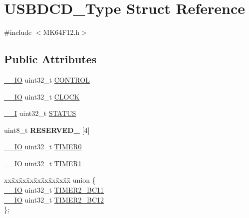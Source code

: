 \hypertarget{structUSBDCD__Type}{}\section{U\+S\+B\+D\+C\+D\+\_\+\+Type Struct Reference}
\label{structUSBDCD__Type}


{\ttfamily \#include $<$M\+K64\+F12.\+h$>$}

\subsection*{Public Attributes}
\begin{DoxyCompactItemize}
\item 
\hyperlink{core__sc300_8h_aec43007d9998a0a0e01faede4133d6be}{\+\_\+\+\_\+\+IO} uint32\+\_\+t \hyperlink{structUSBDCD__Type_a3a2cb0f60abc115c51cf3124ef86e5a0}{C\+O\+N\+T\+R\+OL}
\item 
\hyperlink{core__sc300_8h_aec43007d9998a0a0e01faede4133d6be}{\+\_\+\+\_\+\+IO} uint32\+\_\+t \hyperlink{structUSBDCD__Type_a8b412fbc6cfe129f3b73aededa8c2619}{C\+L\+O\+CK}
\item 
\hyperlink{core__sc300_8h_af63697ed9952cc71e1225efe205f6cd3}{\+\_\+\+\_\+I} uint32\+\_\+t \hyperlink{structUSBDCD__Type_a47a8d16e5cafbe66cf4fc40e26f286f1}{S\+T\+A\+T\+US}
\item 
uint8\+\_\+t {\bfseries R\+E\+S\+E\+R\+V\+E\+D\+\_} \mbox{[}4\mbox{]}\hypertarget{structUSBDCD__Type_a7ed6e08e3f6e4efb386100c51699497c}{}\label{structUSBDCD__Type_a7ed6e08e3f6e4efb386100c51699497c}

\item 
\hyperlink{core__sc300_8h_aec43007d9998a0a0e01faede4133d6be}{\+\_\+\+\_\+\+IO} uint32\+\_\+t \hyperlink{structUSBDCD__Type_a6e328c4cd993e55a0d0f2ed2c0405c72}{T\+I\+M\+E\+R0}
\item 
\hyperlink{core__sc300_8h_aec43007d9998a0a0e01faede4133d6be}{\+\_\+\+\_\+\+IO} uint32\+\_\+t \hyperlink{structUSBDCD__Type_a6e397d8b8cca49e7b0742538144e4d15}{T\+I\+M\+E\+R1}
\item 
\begin{tabbing}
xx\=xx\=xx\=xx\=xx\=xx\=xx\=xx\=xx\=\kill
union \{\\
\>\hyperlink{core__sc300_8h_aec43007d9998a0a0e01faede4133d6be}{\_\_IO} uint32\_t \hyperlink{structUSBDCD__Type_acf2614fc5d64ffb02c2b6551a4cfcd2a}{TIMER2\_BC11}\\
\>\hyperlink{core__sc300_8h_aec43007d9998a0a0e01faede4133d6be}{\_\_IO} uint32\_t \hyperlink{structUSBDCD__Type_ada6fdec9ca1667fefe2e524287a3665c}{TIMER2\_BC12}\\
\}; \hypertarget{structUSBDCD__Type_ab6b1e79161548dff140df20a3847a543}{}\label{structUSBDCD__Type_ab6b1e79161548dff140df20a3847a543}
\\


\end{tabbing}
\end{DoxyCompactItemize}
